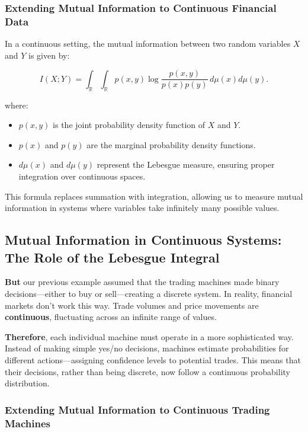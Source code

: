 \subsubsection*{Extending Mutual Information to Continuous Financial Data}

In a continuous setting, the mutual information between two random variables \( X \) and \( Y \) is given by:

\[
I(X; Y) = \int_{\mathbb{R}} \int_{\mathbb{R}} p(x, y) \log \frac{p(x, y)}{p(x) p(y)} \, d\mu(x) d\mu(y).
\]

where:
\begin{itemize}
    \item \( p(x, y) \) is the joint probability density function of \( X \) and \( Y \).
    \item \( p(x) \) and \( p(y) \) are the marginal probability density functions.
    \item \( d\mu(x) \) and \( d\mu(y) \) represent the Lebesgue measure, ensuring proper integration over continuous spaces.
\end{itemize}

This formula replaces summation with integration, allowing us to measure mutual information in systems where variables take infinitely many possible values.

\subsection{Mutual Information in Continuous Systems: The Role of the Lebesgue Integral}

\textbf{But} our previous example assumed that the trading machines made binary decisions—either to buy or sell—creating a discrete system. In reality, financial markets don’t work this way. Trade volumes and price movements are \textbf{continuous}, fluctuating across an infinite range of values.  

\textbf{Therefore}, each individual machine must operate in a more sophisticated way. Instead of making simple yes/no decisions, machines estimate probabilities for different actions—assigning confidence levels to potential trades. This means that their decisions, rather than being discrete, now follow a continuous probability distribution.

\subsubsection*{Extending Mutual Information to Continuous Trading Machines}

